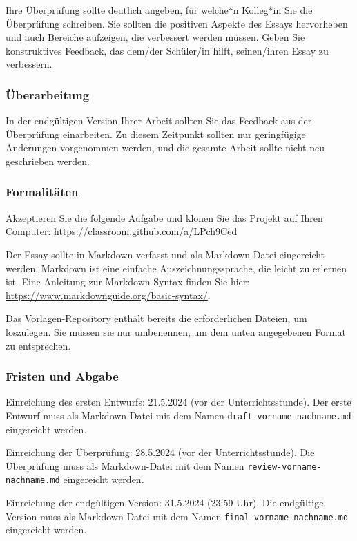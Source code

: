 \documentclass[12pt,a4paper]{report}
\begin{document}
Ihre Überprüfung sollte deutlich angeben, für welche*n Kolleg*in Sie die Überprüfung schreiben. Sie sollten die positiven Aspekte des Essays hervorheben und auch Bereiche aufzeigen, die verbessert werden müssen. Geben Sie konstruktives Feedback, das dem/der Schüler/in hilft, seinen/ihren Essay zu verbessern.

\subsubsection*{Überarbeitung}
In der endgültigen Version Ihrer Arbeit sollten Sie das Feedback aus der Überprüfung einarbeiten. Zu diesem Zeitpunkt sollten nur geringfügige Änderungen vorgenommen werden, und die gesamte Arbeit sollte nicht neu geschrieben werden.

\subsubsection*{Formalitäten}
Akzeptieren Sie die folgende Aufgabe und klonen Sie das Projekt auf Ihren Computer:
\url{https://classroom.github.com/a/LPch9Ced}

Der Essay sollte in Markdown verfasst und als Markdown-Datei eingereicht werden. Markdown ist eine einfache Auszeichnungssprache, die leicht zu erlernen ist. Eine Anleitung zur Markdown-Syntax finden Sie hier: \url{https://www.markdownguide.org/basic-syntax/}.

Das Vorlagen-Repository enthält bereits die erforderlichen Dateien, um loszulegen. Sie müssen sie nur umbenennen, um dem unten angegebenen Format zu entsprechen.

\subsubsection*{Fristen und Abgabe}

Einreichung des ersten Entwurfs: 21.5.2024 (vor der Unterrichtsstunde). Der erste Entwurf muss als Markdown-Datei mit dem Namen \verb|draft-vorname-nachname.md| eingereicht werden.

Einreichung der Überprüfung: 28.5.2024 (vor der Unterrichtsstunde). Die Überprüfung muss als Markdown-Datei mit dem Namen \verb|review-vorname-nachname.md| eingereicht werden.

Einreichung der endgültigen Version: 31.5.2024 (23:59 Uhr). Die endgültige Version muss als Markdown-Datei mit dem Namen \verb|final-vorname-nachname.md| eingereicht werden.


\newpage
\end{document}
